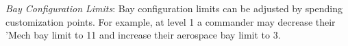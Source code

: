 \emph{Bay Configuration Limits}: Bay configuration limits can be adjusted by spending customization points.
For example, at level 1 a commander may decrease their 'Mech bay limit to 11 and increase their aerospace bay limit to 3.

